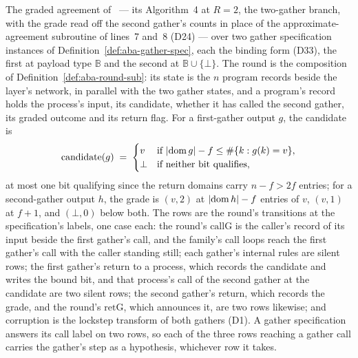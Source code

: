 \begin{definition}
  \label{def:aba-gbca-pair}
  \leanok
  The graded agreement of~\cite{AFW25} --- its Algorithm~4 at $R = 2$, the two-gather branch, with the grade read off the second gather's counts in place of the approximate-agreement subroutine of lines~7 and~8 (D24) --- over two gather specification instances of Definition~\ref{def:aba-gather-spec}, each the binding form (D33), the first at payload type $\mathbb{B}$ and the second at $\mathbb{B} \cup \{\bot\}$.
  The round is the composition of Definition~\ref{def:aba-round-sub}: its state is the $n$ program records beside the layer's network, in parallel with the two gather states, and a program's record holds the process's input, its candidate, whether it has called the second gather, its graded outcome and its return flag.
  For a first-gather output $g$, the candidate is
  \[
    \mathrm{candidate}(g) \;=\;
      \begin{cases}
        v & \text{if } |{\rm dom}\, g| - f \le \#\{k : g(k) = v\},\\
        \bot & \text{if neither bit qualifies,}
      \end{cases}
  \]
  at most one bit qualifying since the return domains carry $n - f > 2f$ entries; for a second-gather output $h$, the grade is $(v, 2)$ at $|{\rm dom}\, h| - f$ entries of $v$, $(v, 1)$ at $f + 1$, and $(\bot, 0)$ below both.
  The rows are the round's transitions at the specification's labels, one case each: the round's $\mathrm{callG}$ is the caller's record of its input beside the first gather's call, and the family's call loops reach the first gather's call with the caller standing still; each gather's internal rules are silent rows; the first gather's return to a process, which records the candidate and writes the bound bit, and that process's call of the second gather at the candidate are two silent rows; the second gather's return, which records the grade, and the round's $\mathrm{retG}$, which announces it, are two rows likewise; and corruption is the lockstep transform of both gathers (D1).
  A gather specification answers its call label on two rows, so each of the three rows reaching a gather call carries the gather's step as a hypothesis, whichever row it takes.

\end{definition}
